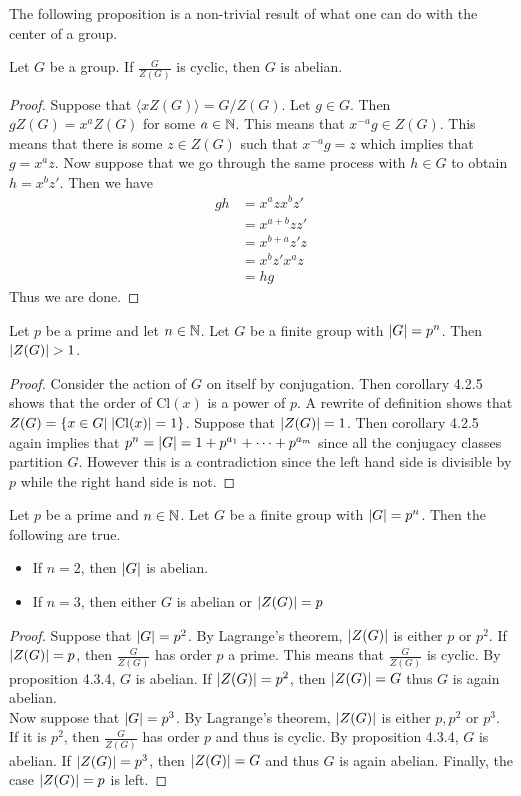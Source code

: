 \documentclass[a4paper]{article}
\begin{document}
The following proposition is a non-trivial result of what one can do with the center of a group. 

\begin{prp}{}{} Let $G$ be a group. If $\frac{G}{Z(G)}$ is cyclic, then $G$ is abelian. 
\begin{proof}
Suppose that $\langle xZ(G)\rangle=G/Z(G)$. Let $g\in G$. Then $gZ(G)=x^aZ(G)$ for some $a\in\mathbb{N}$. This means that $x^{-a}g\in Z(G)$. This means that there is some $z\in Z(G)$ such that $x^{-a}g=z$ which implies that $g=x^az$. Now suppose that we go through the same process with $h\in G$ to obtain $h=x^bz'$. Then we have 
\begin{align*}
gh&=x^azx^bz'\\
&=x^{a+b}zz'\tag{$z\in Z(G)$}\\
&=x^{b+a}z'z\\
&=x^bz'x^az\\
&=hg
\end{align*}
Thus we are done. 
\end{proof}
\end{prp}

\begin{prp}{}{} Let $p$ be a prime and let $n\in\mathbb{N}$. Let $G$ be a finite group with $\abs{G}=p^n$. Then $\abs{Z(G)}>1$. 
\begin{proof}
Consider the action of $G$ on itself by conjugation. Then corollary 4.2.5 shows that the order of $\text{Cl}(x)$ is a power of $p$. A rewrite of definition shows that $Z(G)=\{x\in G|\;\abs{\text{Cl}(x)}=1\}$. Suppose that $\abs{Z(G)}=1$. Then corollary 4.2.5 again implies that $p^n=\abs{G}=1+p^{a_1}+\dots+p^{a_m}$ since all the conjugacy classes partition $G$. However this is a contradiction since the left hand side is divisible by $p$ while the right hand side is not. 
\end{proof}
\end{prp}

\begin{crl}{}{} Let $p$ be a prime and $n\in\mathbb{N}$. Let $G$ be a finite group with $\abs{G}=p^n$. Then the following are true. 
\begin{itemize}
\item If $n=2$, then $\abs{G}$ is abelian. 
\item If $n=3$, then either $G$ is abelian or $\abs{Z(G)}=p$
\end{itemize} 
\begin{proof}
Suppose that $\abs{G}=p^2$. By Lagrange's theorem, $\abs{Z(G)}$ is either $p$ or $p^2$. If $\abs{Z(G)}=p$, then $\frac{G}{Z(G)}$ has order $p$ a prime. This means that $\frac{G}{Z(G)}$ is cyclic. By proposition 4.3.4, $G$ is abelian. If $\abs{Z(G)}=p^2$, then $\abs{Z(G)}=G$ thus $G$ is again abelian. \\

Now suppose that $\abs{G}=p^3$. By Lagrange's theorem, $\abs{Z(G)}$ is either $p,p^2$ or $p^3$. If it is $p^2$, then $\frac{G}{Z(G)}$ has order $p$ and thus is cyclic. By proposition 4.3.4, $G$ is abelian. If $\abs{Z(G)}=p^3$, then $\abs{Z(G)}=G$ and thus $G$ is again abelian. Finally, the case $\abs{Z(G)}=p$ is left. 
\end{proof}
\end{crl}
\end{document}
